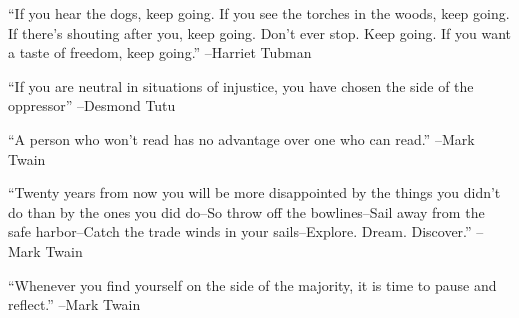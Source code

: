 \documentclass{article}%
\begin{document}
\linebreak%
\vspace{1mm}%
\begin{minipage}{\textwidth}%
\flushleft%
“If you hear the dogs, keep going. If you see the torches in the woods, keep going. If there's shouting after you, keep going. Don't ever stop. Keep going. If you want a taste of freedom, keep going.”%
\linebreak%
\vspace{1mm}%
–Harriet Tubman%
\linebreak%
\vspace{1mm}%
\end{minipage}%
\linebreak%
\vspace{1mm}%
\begin{minipage}{\textwidth}%
\flushleft%
“If you are neutral in situations of injustice, you have chosen the side of the oppressor”%
\linebreak%
\vspace{1mm}%
–Desmond Tutu%
\linebreak%
\vspace{1mm}%
\end{minipage}%
\linebreak%
\vspace{1mm}%
\begin{minipage}{\textwidth}%
\flushleft%
“A person who won't read has no advantage over one who can read.”%
\linebreak%
\vspace{1mm}%
–Mark Twain%
\linebreak%
\vspace{1mm}%
\end{minipage}%
\linebreak%
\vspace{1mm}%
\begin{minipage}{\textwidth}%
\flushleft%
“Twenty years from now you will be more disappointed by the things you didn't do than by the ones you did do–So throw off the bowlines–Sail away from the safe harbor–Catch the trade winds in your sails–Explore. Dream. Discover.”%
\linebreak%
\vspace{1mm}%
–Mark Twain%
\linebreak%
\vspace{1mm}%
\end{minipage}%
\linebreak%
\vspace{1mm}%
\begin{minipage}{\textwidth}%
\flushleft%
“Whenever you find yourself on the side of the majority, it is time to pause and reflect.”%
\linebreak%
\vspace{1mm}%
–Mark Twain%
\linebreak%
\vspace{1mm}%
\end{minipage}%
\end{document}
